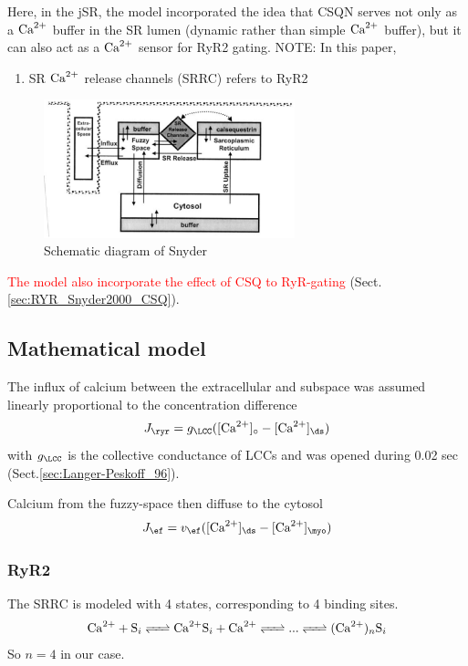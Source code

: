 Here, in the jSR, the model incorporated the idea that CSQN serves not only as a
${\text{Ca}^{2+}}$ buffer in the SR lumen (dynamic rather than simple ${\text{Ca}^{2+}}$ buffer), but it
can also act as a ${\text{Ca}^{2+}}$ sensor for RyR2 gating.
NOTE: In this paper,
\begin{enumerate}
  \item SR ${\text{Ca}^{2+}}$ release channels (SRRC) refers to RyR2
\end{enumerate}

\begin{figure}[hbt]
  \centerline{\includegraphics[height=4cm,
    angle=0]{./images/snyder2000_model.eps}}
\caption{Schematic diagram of Snyder}
\label{fig:snyder2000_model}
\end{figure}

\textcolor{red}{The model also incorporate the effect of CSQ to RyR-gating}
(Sect.\ref{sec:RYR_Snyder2000_CSQ}).

\subsection{Mathematical model}

The influx of calcium between the extracellular and subspace was assumed
linearly proportional to the concentration difference
\begin{equation}
J_\ryr  = g_\LCC ([\Ca]_\circ - [\Ca]_\ds)
\end{equation}
with $g_\LCC$ is the collective conductance of LCCs and was opened during 0.02
sec \citep{langer1996} (Sect.\ref{sec:Langer-Peskoff_96}).

Calcium from the fuzzy-space then diffuse to the cytosol
\begin{equation}
J_\ef = v_\ef ([\Ca]_\ds - [\Ca]_\myo)
\end{equation}


\subsubsection{RyR2}

The SRRC is modeled with 4 states, corresponding to 4 binding sites.
\begin{equation}
\ce{Ca^2+ + S_i <=> Ca^2+S_i + Ca^2+ <=> ... <=> (Ca^2+)_nS_i}
\end{equation}
So $n=4$ in our case.


